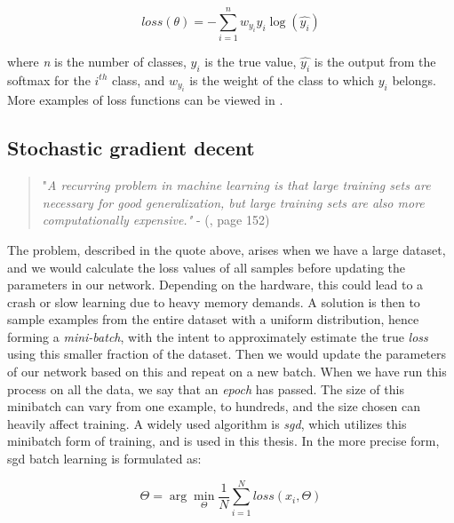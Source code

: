         \begin{equation} \label{cross_entropy}
            loss(\theta) = - \sum^{n}_{i=1} w_{y_{i}}y_{i}\log(\hat{y_{i}})
        \end{equation}
    
    where \textit{n} is the number of classes, $y_{i}$ is the true value, $\hat{y_{i}}$ is the output from the softmax for the $i^{th}$ class, and $w_{y_{i}}$ is the weight of the class to which $y_{i}$ belongs. More examples of loss functions can be viewed in \citeauthor{mishra2017deep}\cite{mishra2017deep}.
    


\subsection{Stochastic gradient decent} \label{batch learning}
        \begin{quote}
        "\textit{A recurring problem in machine learning is that large training sets are necessary for good generalization, but large training sets are also more computationally
        expensive."} - (\citeauthor{Goodfellow-et-al-2016_SGD}\citeyear{Goodfellow-et-al-2016_SGD}, page 152)
    \end{quote}
    
    The problem, described in the quote above, arises when we have a large dataset, and we would calculate the loss values of all samples before updating the parameters in our network\cite{Goodfellow-et-al-2016_SGD}. Depending on the hardware, this could lead to a crash or slow learning due to heavy memory demands. A solution is then to sample examples from the entire dataset with a uniform distribution, hence forming a \textit{mini-batch}, with the intent to approximately estimate the true \textit{loss} using this smaller fraction of the dataset. Then we would update the parameters of our network based on this and repeat on a new batch. When we have run this process on all the data, we say that an \textit{epoch} has passed. The size of this minibatch can vary from one example, to hundreds, and the size chosen can heavily affect training\cite{wilson2001need_learning_rate}. A widely used algorithm is \textit{\gls{sgd}}\cite{Goodfellow-et-al-2016_SGD}, which utilizes this minibatch form of training, and is used in this thesis. In the more precise form, \gls{sgd} batch learning is formulated as:
    
        \begin{equation} \label{batch_learning_eq}
            \Theta = \arg \min_{\Theta}\dfrac{1}{N} \sum^{N}_{i=1} loss (x_{i},\Theta)
        \end{equation}
    
